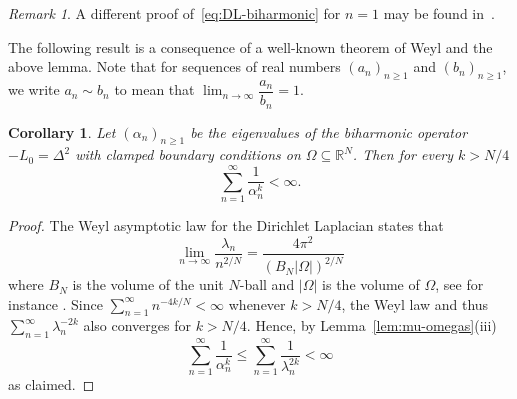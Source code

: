 \documentclass[a4paper, reqno]{amsart}
\numberwithin{equation}{section}
\theoremstyle{plain}
\newtheorem{corollary}[theorem]{Corollary}
\theoremstyle{definition}
\theoremstyle{remark}
\newtheorem{remark}[theorem]{Remark}
\newcommand{\RR}{\mathbb{R}}
\begin{document}
\begin{remark}
  A different proof of~\eqref{eq:DL-biharmonic} for $n=1$ may be found in~\cite[Remark 4]{SS20}.
\end{remark}

The following result is a consequence of a well-known theorem of Weyl and the above lemma. Note that for sequences of real numbers $(a_n)_{n \ge 1}$ and $(b_n)_{n \ge 1}$, we write $a_n \sim b_n$ to mean that $\lim_{n \to \infty} \dfrac{a_n}{b_n} = 1$.
\begin{corollary}
  \label{cor:eig-series}
  Let $(\alpha_n)_{n \ge 1}$ be the eigenvalues of the biharmonic operator $-L_0 = \Delta^2$ with clamped boundary conditions on $\Omega \subseteq \RR^N$. Then for every $k>N/4$
  \begin{equation}
    \label{eq:eig-series2}
    \sum_{n=1}^\infty \frac{1}{\alpha_n^{k}} < \infty.
  \end{equation}
\end{corollary}

\begin{proof}
  The Weyl asymptotic law for the Dirichlet Laplacian states that
  \begin{equation*}
    \lim_{n \to \infty} \frac{\lambda_n}{n^{2/N}}
    = \frac{4\pi^2}{(B_N |\Omega|)^{2/N}}
  \end{equation*}
  where $B_N$ is the volume of the unit $N$-ball and $|\Omega|$ is the volume of $\Omega$, see for instance \cite[p.~55]{ANPS}. Since $\sum_{n=1}^\infty n^{-4k/N}<\infty$ whenever $k>N/4$, the Weyl law and thus $\sum_{n=1}^\infty\lambda_n^{-2k}$ also converges for $k>N/4$. Hence, by Lemma~\ref{lem:mu-omegas}(iii)
  \begin{equation}
    \label{eq:eig-series-dom}
    \sum_{n=1}^\infty\frac{1}{\alpha_n^k}
    \leq\sum_{n=1}^\infty \frac{1}{\lambda_n^{2k}}<\infty
  \end{equation}
  as claimed.
\end{proof}
\end{document}
